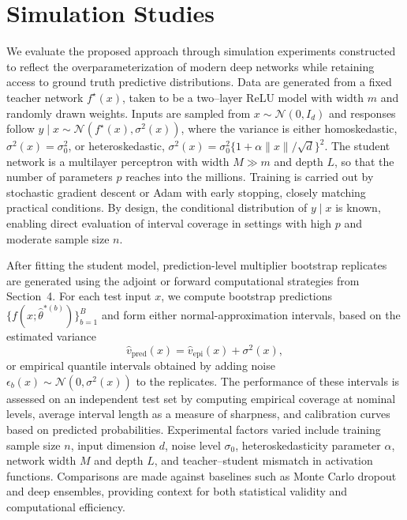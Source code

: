 \documentclass[12pt, titlepage, reqno]{article}
\begin{document}
\section{Simulation Studies}

We evaluate the proposed approach through simulation experiments
constructed to reflect the overparameterization of modern deep
networks while retaining access to ground truth predictive
distributions. Data are generated from a fixed teacher network
$f^\star(x)$, taken to be a two–layer ReLU model with width $m$ and
randomly drawn weights. Inputs are sampled from
$x\sim\mathcal{N}(0,I_d)$ and responses follow
$y\mid x \sim \mathcal{N}(f^\star(x),\sigma^2(x))$, where the variance
is either homoskedastic, $\sigma^2(x)=\sigma_0^2$, or heteroskedastic,
$\sigma^2(x)=\sigma_0^2\{1+\alpha \|x\|/\sqrt{d}\}^2$. The student
network is a multilayer perceptron with width $M\gg m$ and depth $L$,
so that the number of parameters $p$ reaches into the millions.
Training is carried out by stochastic gradient descent or Adam with
early stopping, closely matching practical conditions. By design, the
conditional distribution of $y\mid x$ is known, enabling direct
evaluation of interval coverage in settings with high $p$ and moderate
sample size $n$.


After fitting the student model, prediction-level multiplier bootstrap
replicates are generated using the adjoint or forward computational
strategies from Section~4. For each test input $x$, we compute
bootstrap predictions $\{f(x;\hat\theta^{*(b)})\}_{b=1}^B$ and form
either normal-approximation intervals, based on the estimated variance
\[
  \widehat v_{\mathrm{pred}}(x) =
  \widehat v_{\mathrm{epi}}(x) + \sigma^2(x),
\]
or empirical quantile intervals obtained by adding noise
$\epsilon_b(x)\sim\mathcal{N}(0,\sigma^2(x))$ to the replicates. The
performance of these intervals is assessed on an independent test set
by computing empirical coverage at nominal levels, average interval
length as a measure of sharpness, and calibration curves based on
predicted probabilities. Experimental factors varied include training
sample size $n$, input dimension $d$, noise level $\sigma_0$,
heteroskedasticity parameter $\alpha$, network width $M$ and depth $L$,
and teacher–student mismatch in activation functions. Comparisons are
made against baselines such as Monte Carlo dropout and deep ensembles,
providing context for both statistical validity and computational
efficiency.
\end{document}
